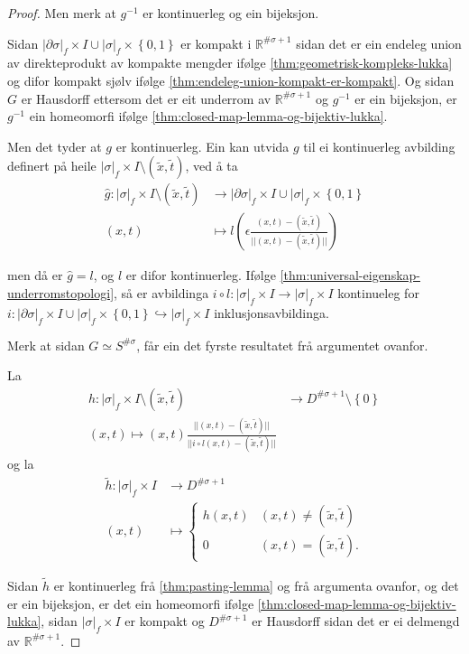 \documentclass[a4paper, 12pt, norsk]{article}
\theoremstyle{plain}
\theoremstyle{definition}
\newcommand{\Rb}{\mathbb{R}}
\newcommand{\union}{ \mathop{\cup}\limits }
\newcommand{\gr}[1]{ \lvert #1 \rvert } %
\newcommand{\set}[1]{ \left\{ #1 \right\} } %
\newcommand{\tuple}[1]{ \left( #1 \right) } %
\begin{document}
\begin{proof}
	Men merk at  \( g^{-1} \) er kontinuerleg og ein bijeksjon.
	
	Sidan \( \gr{\partial\sigma}_f \times I \union \gr{\sigma}_f \times \set{0, 1} \) er kompakt i \( \Rb^{\#\sigma+1} \) sidan det er ein endeleg union av direkteprodukt av kompakte mengder ifølge \autoref{thm:geometrisk-kompleks-lukka} og difor kompakt sjølv ifølge \autoref{thm:endeleg-union-kompakt-er-kompakt}. Og sidan \( G \) er Hausdorff ettersom det er eit underrom av \( \Rb^{\#\sigma+1} \) og \( g^{-1} \) er ein bijeksjon, er \( g^{-1} \) ein homeomorfi ifølge \autoref{thm:closed-map-lemma-og-bijektiv-lukka}.
	
	Men det tyder at \( g \) er kontinuerleg. Ein kan utvida \( g \) til ei kontinuerleg avbilding definert på heile \( \gr{\sigma}_f \times I \setminus \tuple{\tilde{x}, \tilde{t}} \), ved å ta
	\begin{align*}
		\hat{g} : \gr{\sigma}_f \times I \setminus \tuple{\tilde{x}, \tilde{t}} &\to \gr{\partial\sigma}_f \times I \union \gr{\sigma}_f \times \set{0, 1} \\
		(x,t) &\mapsto l\tuple{\epsilon\frac{(x,t)-\tuple{\tilde{x}, \tilde{t}}}{||(x,t) - \tuple{\tilde{x}, \tilde{t}}||}}
	\end{align*}

	men då er \( \hat{g} = l \), og \( l \) er difor kontinuerleg. Ifølge \autoref{thm:universal-eigenskap-underromstopologi}, så er avbildinga \( i \circ l : \gr{\sigma}_f \times I \to \gr{\sigma}_f \times I \) kontinueleg for \( i: \gr{\partial\sigma}_f \times I \union \gr{\sigma}_f \times \set{0, 1} \hookrightarrow \gr{\sigma}_f \times I \) inklusjonsavbildinga.
	
	Merk at sidan \( G \simeq S^{\#\sigma} \), får ein det fyrste resultatet frå argumentet ovanfor.

	La
	\begin{align*}
		h: \gr{\sigma}_f \times I \setminus \tuple{\tilde{x}, \tilde{t}} &\to D^{\#\sigma+1} \setminus \set{0} \\
		(x, t) \mapsto \tuple{x, t}\frac{||(x,t) - (\tilde{x}, \tilde{t})||}{||i\circ l(x,t)-(\tilde{x}, \tilde{t})||}
	\end{align*}
	og la
	\begin{align*}
		\tilde{h}: \gr{\sigma}_f \times I &\to D^{\#\sigma+1} \\
		(x,t) &\mapsto
		\begin{cases}
			h(x,t) & (x, t) \neq (\tilde{x}, \tilde{t}) \\
			0 & (x, t) = (\tilde{x}, \tilde{t}).
		\end{cases}
	\end{align*}

	Sidan \( \tilde{h} \) er kontinuerleg frå \autoref{thm:pasting-lemma} og frå argumenta ovanfor, og det er ein bijeksjon, er det ein homeomorfi ifølge \autoref{thm:closed-map-lemma-og-bijektiv-lukka}, sidan \( \gr{\sigma}_f \times I \) er kompakt og \( D^{\#\sigma+1} \) er Hausdorff sidan det er ei delmengd av \( \Rb^{\#\sigma+1} \).
\end{proof}
\end{document}
